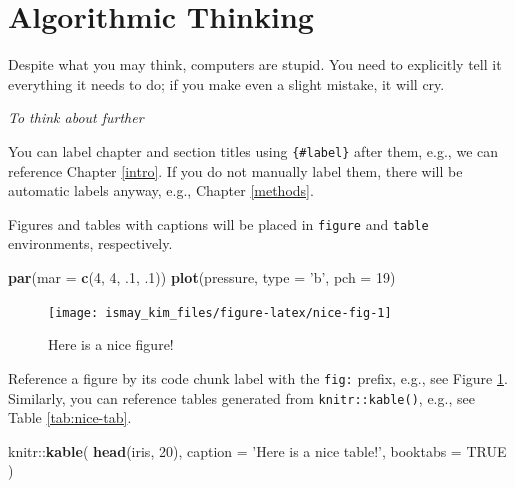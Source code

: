 \documentclass[]{tufte-book}
\newenvironment{Shaded}{\begin{snugshade}}{\end{snugshade}}
\newcommand{\KeywordTok}[1]{\textcolor[rgb]{0.13,0.29,0.53}{\textbf{{#1}}}}
\newcommand{\DataTypeTok}[1]{\textcolor[rgb]{0.13,0.29,0.53}{{#1}}}
\newcommand{\DecValTok}[1]{\textcolor[rgb]{0.00,0.00,0.81}{{#1}}}
\newcommand{\StringTok}[1]{\textcolor[rgb]{0.31,0.60,0.02}{{#1}}}
\newcommand{\OtherTok}[1]{\textcolor[rgb]{0.56,0.35,0.01}{{#1}}}
\newcommand{\NormalTok}[1]{{#1}}
\begin{document}
\section{Algorithmic Thinking}\label{algorithmic-thinking}

Despite what you may think, computers are stupid. You need to explicitly
tell it everything it needs to do; if you make even a slight mistake, it
will cry.

\emph{To think about further}

You can label chapter and section titles using \texttt{\{\#label\}}
after them, e.g., we can reference Chapter \ref{intro}. If you do not
manually label them, there will be automatic labels anyway, e.g.,
Chapter \ref{methods}.

Figures and tables with captions will be placed in \texttt{figure} and
\texttt{table} environments, respectively.

\begin{Shaded}
\begin{Highlighting}[]
\KeywordTok{par}\NormalTok{(}\DataTypeTok{mar =} \KeywordTok{c}\NormalTok{(}\DecValTok{4}\NormalTok{, }\DecValTok{4}\NormalTok{, .}\DecValTok{1}\NormalTok{, .}\DecValTok{1}\NormalTok{))}
\KeywordTok{plot}\NormalTok{(pressure, }\DataTypeTok{type =} \StringTok{'b'}\NormalTok{, }\DataTypeTok{pch =} \DecValTok{19}\NormalTok{)}
\end{Highlighting}
\end{Shaded}

\begin{figure}

{\centering \texttt{[image: ismay\_kim\_files/figure-latex/nice-fig-1]} 

}

\caption[Here is a nice figure!]{Here is a nice figure!}\label{fig:nice-fig}
\end{figure}

Reference a figure by its code chunk label with the \texttt{fig:}
prefix, e.g., see Figure \ref{fig:nice-fig}. Similarly, you can
reference tables generated from \texttt{knitr::kable()}, e.g., see Table
\ref{tab:nice-tab}.

\begin{Shaded}
\begin{Highlighting}[]
\NormalTok{knitr::}\KeywordTok{kable}\NormalTok{(}
  \KeywordTok{head}\NormalTok{(iris, }\DecValTok{20}\NormalTok{), }\DataTypeTok{caption =} \StringTok{'Here is a nice table!'}\NormalTok{,}
  \DataTypeTok{booktabs =} \OtherTok{TRUE}
\NormalTok{)}
\end{Highlighting}
\end{Shaded}
\end{document}
